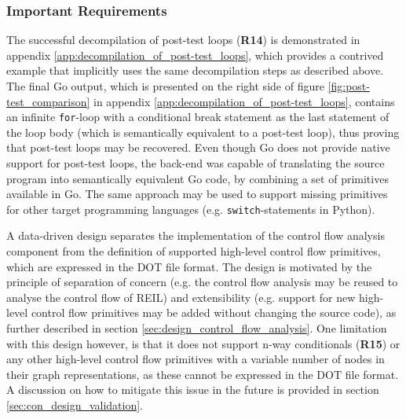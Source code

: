 
\subsubsection{Important Requirements}
\label{sec:eval_control_flow_analysis_library_important_requirements}


The successful decompilation of post-test loops (\textbf{R14}) is demonstrated in appendix \ref{app:decompilation_of_post-test_loops}, which provides a contrived example that implicitly uses the same decompilation steps as described above. The final Go output, which is presented on the right side of figure \ref{fig:post-test_comparison} in appendix \ref{app:decompilation_of_post-test_loops}, contains an infinite \texttt{for}-loop with a conditional break statement as the last statement of the loop body (which is semantically equivalent to a post-test loop), thus proving that post-test loops may be recovered. Even though Go does not provide native support for post-test loops, the back-end was capable of translating the source program into semantically equivalent Go code, by combining a set of primitives available in Go. The same approach may be used to support missing primitives for other target programming languages (e.g. \texttt{switch}-statements in Python).


A data-driven design separates the implementation of the control flow analysis component from the definition of supported high-level control flow primitives, which are expressed in the DOT file format. The design is motivated by the principle of separation of concern (e.g. the control flow analysis may be reused to analyse the control flow of REIL) and extensibility (e.g. support for new high-level control flow primitives may be added without changing the source code), as further described in section \ref{sec:design_control_flow_analysis}. One limitation with this design however, is that it does not support n-way conditionals (\textbf{R15}) or any other high-level control flow primitives with a variable number of nodes in their graph representations, as these cannot be expressed in the DOT file format. A discussion on how to mitigate this issue in the future is provided in section \ref{sec:con_design_validation}.
